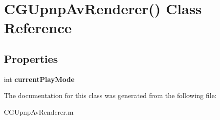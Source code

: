 \hypertarget{interface_c_g_upnp_av_renderer_07_08}{\section{C\-G\-Upnp\-Av\-Renderer() Class Reference}
\label{interface_c_g_upnp_av_renderer_07_08}
}
\subsection*{Properties}
\begin{DoxyCompactItemize}
\item 
\hypertarget{interface_c_g_upnp_av_renderer_07_08_ad08c057701d62e6a5e78e353686e507b}{int {\bfseries current\-Play\-Mode}}\label{interface_c_g_upnp_av_renderer_07_08_ad08c057701d62e6a5e78e353686e507b}

\end{DoxyCompactItemize}


The documentation for this class was generated from the following file\-:\begin{DoxyCompactItemize}
\item 
C\-G\-Upnp\-Av\-Renderer.\-m\end{DoxyCompactItemize}
